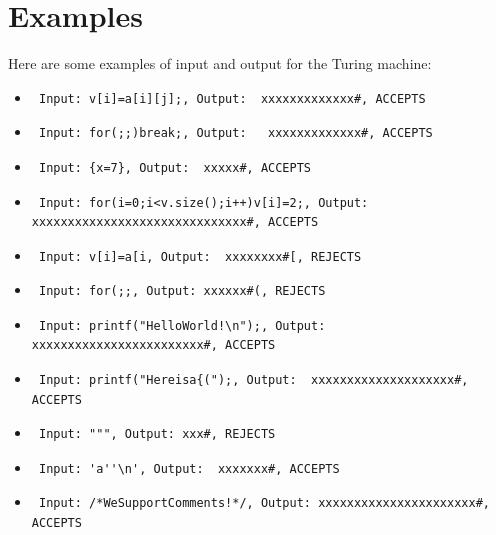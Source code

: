 \documentclass{article}
\begin{document}
{{\section{Examples}
Here are some examples of input and output for the Turing machine:
\begin{itemize}
    \item \begin{verbatim} Input: v[i]=a[i][j];, Output:  xxxxxxxxxxxxx#, ACCEPTS \end{verbatim}
    \item \begin{verbatim} Input: for(;;)break;, Output:   xxxxxxxxxxxxx#, ACCEPTS \end{verbatim}
    \item \begin{verbatim} Input: {x=7}, Output:  xxxxx#, ACCEPTS \end{verbatim}
    \item \begin{verbatim} Input: for(i=0;i<v.size();i++)v[i]=2;, Output: xxxxxxxxxxxxxxxxxxxxxxxxxxxxxx#, ACCEPTS \end{verbatim}
    \item \begin{verbatim} Input: v[i]=a[i, Output:  xxxxxxxx#[, REJECTS \end{verbatim}
    \item \begin{verbatim} Input: for(;;, Output: xxxxxx#(, REJECTS \end{verbatim}
    \item \begin{verbatim} Input: printf("HelloWorld!\n");, Output: xxxxxxxxxxxxxxxxxxxxxxxx#, ACCEPTS \end{verbatim}
    \item \begin{verbatim} Input: printf("Hereisa{(");, Output:  xxxxxxxxxxxxxxxxxxxx#, ACCEPTS \end{verbatim}
    \item \begin{verbatim} Input: """, Output: xxx#, REJECTS \end{verbatim}
    \item \begin{verbatim} Input: 'a''\n', Output:  xxxxxxx#, ACCEPTS \end{verbatim}
    \item \begin{verbatim} Input: /*WeSupportComments!*/, Output: xxxxxxxxxxxxxxxxxxxxxx#, ACCEPTS \end{verbatim}

\end{itemize}}}
\end{document}
